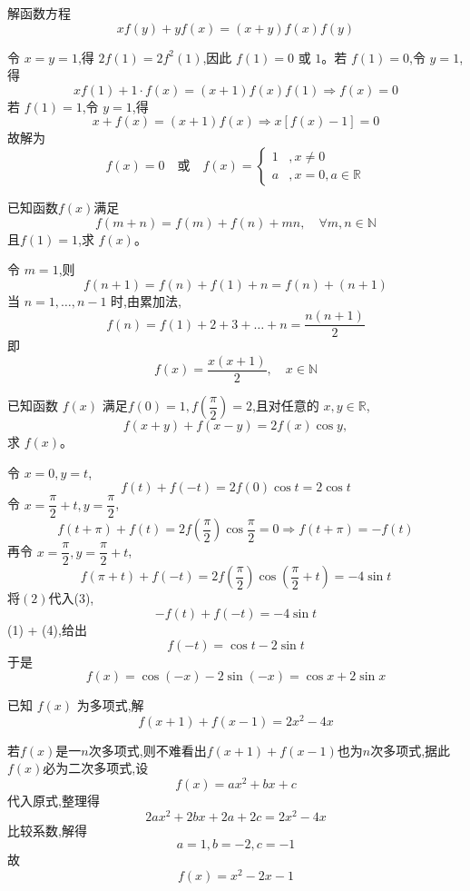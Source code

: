 \begin{questions}
    \question 解函数方程 
    \[
    xf(y) + yf(x) = (x+y)f(x)f(y)
    \]
    \begin{solution}
        令 $x = y = 1$,得 $2f(1) = 2f^2(1)$,因此 $f(1) = 0$ 或 $1$。若 $f(1) = 0$,令 $y = 1$,得 
        \[
        xf(1) + 1 \cdot f(x) = (x+1)f(x)f(1) \Rightarrow f(x) = 0
        \]
        若 $f(1) = 1$,令 $y = 1$,得 
        \[
        x + f(x) = (x+1)f(x) \Rightarrow x[f(x) - 1] = 0
        \]
        故解为
        \[
        f(x) = 0 \quad \text{或} \quad f(x) = 
        \begin{cases} 
        1 & ,x \neq 0 \\ a & ,x = 0, a \in \mathbb{R}
        \end{cases}
        \]
    \end{solution}

    \question 已知函数$f(x)$满足 
    \[
    f(m+n) = f(m) + f(n) + mn, \quad \forall m,n \in \mathbb{N}
    \]
    且$f(1) = 1$,求 $f(x)$。
    \begin{solution}
        令 $m = 1$,则 
        \[
        f(n+1) = f(n) + f(1) + n = f(n) + (n+1)
        \]
        当 $n=1, \dots, n-1$ 时,由累加法,
        \[
        f(n) = f(1) + 2 + 3 + \dots + n = \frac{n(n+1)}{2}
        \]
        即 
        \[
        f(x) = \frac{x(x+1)}{2}, \quad x \in \mathbb{N}
        \]
    \end{solution}

    \question 已知函数 $f(x)$ 满足$f(0) = 1, f\left(\dfrac{\pi}{2}\right) = 2$,且对任意的 $x, y \in \mathbb{R}$,
    \[
    f(x+y) + f(x-y) = 2f(x)\cos y,
    \]
    求 $f(x)$。
    \begin{solution}
        令 $x = 0, y = t$,
        \[
        f(t) + f(-t) = 2f(0)\cos t = 2\cos t \tag{1}
        \]
        令 $x = \dfrac{\pi}{2} + t, y = \dfrac{\pi}{2}$,
        \[
        f(t+\pi) + f(t) = 2f\left(\frac{\pi}{2}\right)\cos\frac{\pi}{2} = 0 \Rightarrow f(t+\pi) = -f(t) \tag{2}
        \]
        再令 $x = \dfrac{\pi}{2}, y = \dfrac{\pi}{2} + t$,
        \[
        f(\pi+t) + f(-t) = 2f\left(\frac{\pi}{2}\right)\cos\left(\frac{\pi}{2}+t\right) = -4\sin t \tag{3}
        \]
        将$(2)$代入(3),
        \[
        -f(t) + f(-t) = -4\sin t \tag{4}
        \]
        (1) + (4),给出
        \[
        f(-t) = \cos t - 2\sin t
        \]
        于是
        \[
        f(x) = \cos(-x) - 2\sin(-x) = \cos x + 2\sin x
        \]
    \end{solution}

    \question 已知 $f(x)$ 为多项式,解 
    \[
    f(x+1) + f(x-1) = 2x^2 - 4x
    \]
    \begin{solution}
        若$f(x)$是一$n$次多项式,则不难看出$f(x+1) + f(x-1)$也为$n$次多项式,据此$f(x)$必为二次多项式,设 
        \[
        f(x) = ax^2 + bx + c
        \]
        代入原式,整理得
        \[
        2ax^2 + 2bx + 2a + 2c = 2x^2 - 4x
        \]
        比较系数,解得
        \[
        a = 1, b = -2, c = -1
        \]
        故 
        \[
        f(x) = x^2 - 2x - 1
        \]
    \end{solution}


\end{questions}
